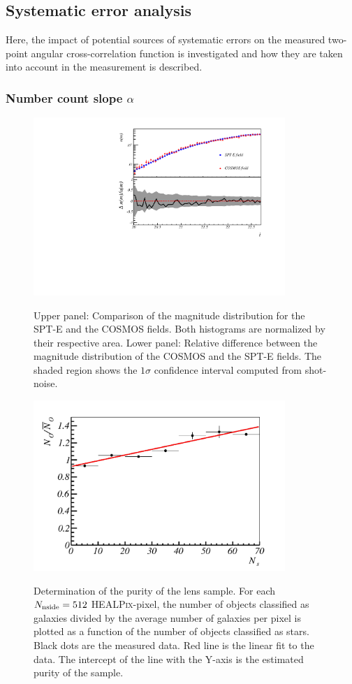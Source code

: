 \subsection{Systematic error analysis}
Here, the impact of potential sources of systematic errors on the measured two-point angular cross-correlation function is investigated and how they are taken into account in the measurement is described.

\subsubsection{Number count slope $\alpha$}
    
\begin{figure}
\begin{center}
\includegraphics[width=0.85\textwidth]{./figures/SPTE_SNe.pdf}
\caption{Upper panel: Comparison of the magnitude distribution for the SPT-E and the COSMOS fields. Both histograms are normalized by their respective area. Lower panel: Relative difference between the magnitude distribution of the COSMOS and the SPT-E fields. The shaded region shows the $1\sigma$ confidence interval computed from shot-noise.}
\label{fig:ndmSN}
	\includegraphics[width=0.85\textwidth]{./figures/purity_lens.pdf}
    \caption{Determination of the purity of the lens sample. For each $N_{\rm nside}=512$ {\scshape HEALPix}-pixel, the number of objects classified as galaxies divided by the average number of galaxies per pixel is plotted as a function of the  number of objects classified as stars. Black dots are the measured data. Red line is the linear fit to the data. The intercept of the line with the Y-axis is the estimated purity of the sample.}
    \label{fig:purity}
    \end{center}
\end{figure}
